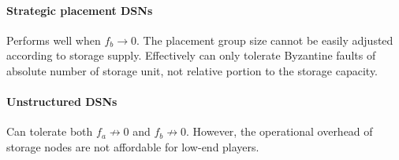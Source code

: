 \paragraph{Strategic placement DSNs}
Performs well when $f_b\to 0$.
The placement group size cannot be easily adjusted according to \eg storage supply.
Effectively can only tolerate Byzantine faults of absolute number of storage unit, not relative portion to the storage capacity.

\paragraph{Unstructured DSNs}
Can tolerate both $f_a\not\to 0$ and $f_b\not\to 0$.
However, the operational overhead of storage nodes are not affordable for low-end players.
